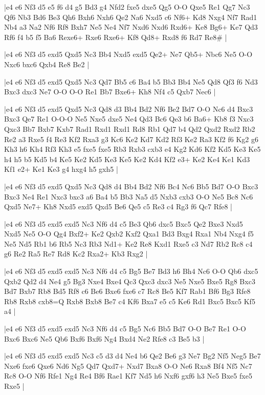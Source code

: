 \whitename{}
\blackname{}
\makegametitle
|e4 e6 Nf3 d5 e5 f6 d4 g5 Bd3 g4 Nfd2 fxe5 dxe5 Qg5 O-O Qxe5 Re1 Qg7 Nc3 Qf6 Nb3 Bd6 Be3 Qh6 Bxh6 Nxh6 Qe2 Na6 Nxd5 c6 Nf6+ Kd8 Nxg4 Nf7 Rad1 Nb4 a3 Na2 Nf6 Rf8 Bxh7 Ne5 Ne4 Nf7 Nxd6 Nxd6 Rxd6+ Ke8 Bg6+ Ke7 Qd3 Rf6 f4 b5 f5 Ba6 Rexe6+ Rxe6 Rxe6+ Kf8 Qd8+ Rxd8 f6 Rd7 Re8\#  |

\whitename{}
\blackname{}
\makegametitle
|e4 e6 Nf3 d5 exd5 Qxd5 Nc3 Bb4 Nxd5 exd5 Qe2+ Ne7 Qb5+ Nbc6 Ne5 O-O Nxc6 bxc6 Qxb4 Re8 Be2  |

\whitename{}
\blackname{}
\makegametitle
|e4 e6 Nf3 d5 exd5 Qxd5 Nc3 Qd7 Bb5 c6 Ba4 b5 Bb3 Bb4 Ne5 Qd8 Qf3 f6 Nd3 Bxc3 dxc3 Ne7 O-O O-O Re1 Bb7 Bxe6+ Kh8 Nf4 c5 Qxb7 Nec6  |

\whitename{}
\blackname{}
\makegametitle
|e4 e6 Nf3 d5 exd5 Qxd5 Nc3 Qd8 d3 Bb4 Bd2 Nf6 Be2 Bd7 O-O Nc6 d4 Bxc3 Bxc3 Qe7 Re1 O-O-O Ne5 Nxe5 dxe5 Ne4 Qd3 Bc6 Qe3 b6 Ba6+ Kb8 f3 Nxc3 Qxc3 Bb7 Bxb7 Kxb7 Rad1 Rxd1 Rxd1 Rd8 Rb1 Qd7 b4 Qd2 Qxd2 Rxd2 Rb2 Re2 a3 Rxe5 f4 Re3 Kf2 Rxa3 g3 Kc6 Ke2 Kd7 Kd2 Rf3 Ke2 Ra3 Kf2 f6 Kg2 g6 Kh3 h6 Kh4 Rf3 Kh3 e5 fxe5 fxe5 Rb3 Rxb3 cxb3 e4 Kg2 Kd6 Kf2 Kd5 Ke3 Ke5 h4 h5 b5 Kd5 b4 Ke5 Ke2 Kd5 Ke3 Ke5 Ke2 Kd4 Kf2 e3+ Ke2 Ke4 Ke1 Kd3 Kf1 e2+ Ke1 Ke3 g4 hxg4 h5 gxh5  |

\whitename{}
\blackname{}
\makegametitle
|e4 e6 Nf3 d5 exd5 Qxd5 Nc3 Qd8 d4 Bb4 Bd2 Nf6 Bc4 Nc6 Bb5 Bd7 O-O Bxc3 Bxc3 Ne4 Re1 Nxc3 bxc3 a6 Ba4 b5 Bb3 Na5 d5 Nxb3 cxb3 O-O Ne5 Bc8 Nc6 Qxd5 Ne7+ Kh8 Nxd5 exd5 Qxd5 Be6 Qe5 c5 Re3 c4 Rg3 f6 Qc7 Rfe8  |

\whitename{}
\blackname{}
\makegametitle
|e4 e6 Nf3 d5 exd5 exd5 Nc3 Nf6 d4 c5 Be3 Qb6 dxc5 Bxc5 Qe2 Bxe3 Nxd5 Nxd5 Ne5 O-O Qg4 Bxf2+ Ke2 Qxb2 Kxf2 Qxa1 Bd3 Bxg4 Rxa1 Nb4 Nxg4 f5 Ne5 Nd5 Rb1 b6 Rb5 Nc3 Rb3 Nd1+ Ke2 Re8 Kxd1 Rxe5 c3 Nd7 Rb2 Rc8 c4 g6 Re2 Ra5 Re7 Rd8 Kc2 Rxa2+ Kb3 Rxg2  |

\whitename{}
\blackname{}
\makegametitle
|e4 e6 Nf3 d5 exd5 exd5 Nc3 Nf6 d4 c5 Bg5 Be7 Bd3 h6 Bh4 Nc6 O-O Qb6 dxc5 Qxb2 Qd2 d4 Ne4 g5 Bg3 Nxe4 Bxe4 Qc3 Qxc3 dxc3 Ne5 Nxe5 Bxe5 Rg8 Bxc3 Bd7 Bxb7 Rb8 Bd5 Rf8 c6 Be6 Bxe6 fxe6 c7 Rc8 Be5 Kf7 Rab1 Bf6 Bg3 Rfe8 Rb8 Rxb8 cxb8=Q Rxb8 Bxb8 Be7 c4 Kf6 Bxa7 e5 c5 Ke6 Rd1 Bxc5 Bxc5 Kf5 a4  |

\whitename{}
\blackname{}
\makegametitle
|e4 e6 Nf3 d5 exd5 exd5 Nc3 Nf6 d4 c5 Bg5 Nc6 Bb5 Bd7 O-O Be7 Re1 O-O Bxc6 Bxc6 Ne5 Qb6 Bxf6 Bxf6 Ng4 Bxd4 Ne2 Rfe8 c3 Be5 b3  |

\whitename{}
\blackname{}
\makegametitle
|e4 e6 Nf3 d5 exd5 exd5 Nc3 c5 d3 d4 Ne4 b6 Qe2 Be6 g3 Ne7 Bg2 Nf5 Neg5 Be7 Nxe6 fxe6 Qxe6 Nd6 Ng5 Qd7 Qxd7+ Nxd7 Bxa8 O-O Ne6 Rxa8 Bf4 Nf5 Nc7 Rc8 O-O Nf6 Rfe1 Ng4 Re4 Bf6 Rae1 Kf7 Nd5 h6 Nxf6 gxf6 h3 Ne5 Bxe5 fxe5 Rxe5  |

